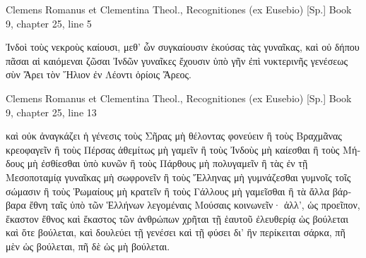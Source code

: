 \documentclass[12pt,letterpaper,twoside,final]{memoir}
\begin{document}
\begin{greek}
Clemens Romanus et Clementina Theol., Recognitiones (ex Eusebio) [Sp.] 
Book 9, chapter 25, line 5

Ἰνδοὶ τοὺς νεκροὺς καίουσι, μεθ' ὧν συγκαίουσιν ἑκούσας τὰς γυναῖκας, 
καὶ οὐ δήπου πᾶσαι αἱ καιόμεναι ζῶσαι Ἰνδῶν γυναῖκες ἔχουσιν ὑπὸ γῆν 
ἐπὶ νυκτερινῆς γενέσεως σὺν Ἄρει τὸν Ἥλιον ἐν Λέοντι ὁρίοις Ἄρεος. 



Clemens Romanus et Clementina Theol., Recognitiones (ex Eusebio) [Sp.] 
Book 9, chapter 25, line 13

                                                           καὶ οὐκ ἀναγκάζει ἡ 
γένεσις τοὺς Σῆρας μὴ θέλοντας φονεύειν ἢ τοὺς Βραχμᾶνας κρεοφαγεῖν 
ἢ τοὺς Πέρσας ἀθεμίτως μὴ γαμεῖν ἢ τοὺς Ἰνδοὺς μὴ καίεσθαι ἢ τοὺς Μήδους   
μὴ ἐσθίεσθαι ὑπὸ κυνῶν ἢ τοὺς Πάρθους μὴ πολυγαμεῖν ἢ τὰς ἐν 
τῇ Μεσοποταμίᾳ γυναῖκας μὴ σωφρονεῖν ἢ τοὺς Ἕλληνας μὴ γυμνάζεσθαι 
γυμνοῖς τοῖς σώμασιν ἢ τοὺς Ῥωμαίους μὴ κρατεῖν ἢ τοὺς Γάλλους μὴ 
γαμεῖσθαι ἢ τὰ ἄλλα βάρβαρα ἔθνη ταῖς ὑπὸ τῶν Ἑλλήνων λεγομέναις 
Μούσαις κοινωνεῖν· ἀλλ', ὡς προεῖπον, ἕκαστον ἔθνος καὶ ἕκαστος τῶν 
ἀνθρώπων χρῆται τῇ ἑαυτοῦ ἐλευθερίᾳ ὡς βούλεται καὶ ὅτε βούλεται, καὶ 
δουλεύει τῇ γενέσει καὶ τῇ φύσει δι' ἣν περίκειται σάρκα, πῆ μὲν ὡς βούλεται, 
πῆ δὲ ὡς μὴ βούλεται. 


\end{greek}

\begin{comment}


Clemens Romanus et Clementina Theol., Recognitiones (ex Eusebio) [Sp.] Book 9, chapter 27, line 2

μνημονεύειν τε ὀφείλετε ὧν προεῖπον, ὅτι καὶ ἐν ἑνὶ κλίματι καὶ ἐν μιᾷ χώρᾳ   
τῶν Ἰνδῶν εἰσιν ἀνθρωποφάγοι Ἰνδοὶ καί εἰσιν οἱ ἐμψύχων ἀπεχόμενοι· 
καὶ ὅτι οἱ Μαγουσαῖοι οὐκ ἐν Περσίδι μόνῃ τὰς θυγατέρας γαμοῦσιν, ἀλλὰ 
καὶ ἐν παντὶ ἔθνει, ὅπου ἂν οἰκήσωσι, τοὺς τῶν προγόνων φυλάσσοντες 
νόμους καὶ τῶν μυστηρίων αὐτῶν τὰς τελετάς. 


\end{comment}
\end{document}
